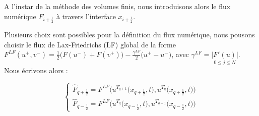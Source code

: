A l'instar de la méthode des volumes finis, nous introduisons alors le flux numérique $\widehat{F}_{i+\frac{1}{2}}$ à travers l'interface $x_{i+\frac{1}{2}}$. 







\vspace{1em}

Plusieurs choix sont possibles pour la définition du flux numérique, nous pousons choisir le flux de Lax-Friedrichs (LF) global de la forme $F^{LF}(u^+,v^-) = \frac{1}{2}\big(F(u^-) + F(v^+)\big) - \frac{\gamma^{LF}}{2}\big(u^+ - u^-\big)$, avec $\gamma^{LF} = \underset{0\leq j \leq N}{|F'(u)|}$. Nous écrivons alors :

$$\begin{cases}
    \widehat{F}_{q +\frac{1}{2}} = F^{LF}\Big(u^{T_{q+1}}\big(x_{q+\frac{1}{2}},t \big),u^{T_{q}}\big(x_{q+\frac{1}{2}},t \big)\Big) \\
    \widehat{F}_{q -\frac{1}{2}} = F^{LF}\Big(u^{T_q}\big(x_{q-\frac{1}{2}},t \big),u^{T_{q-1}}\big(x_{q-\frac{1}{2}},t \big)\Big)
\end{cases}$$

